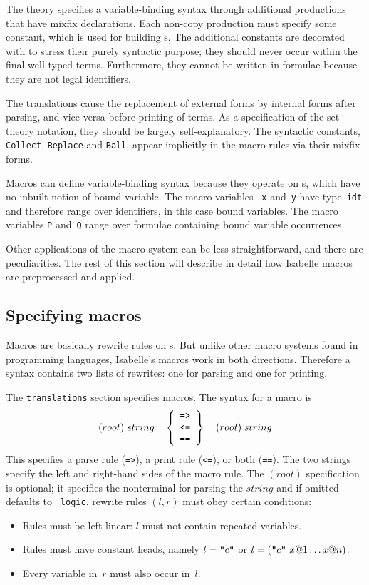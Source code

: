 The theory specifies a variable-binding syntax through additional
productions that have mixfix declarations.  Each non-copy production must
specify some constant, which is used for building \AST{}s.
 The additional constants are decorated with
{\tt\at} to stress their purely syntactic purpose; they should never occur
within the final well-typed terms.  Furthermore, they cannot be written in
formulae because they are not legal identifiers.

The translations cause the replacement of external forms by internal forms
after parsing, and vice versa before printing of terms.  As a specification
of the set theory notation, they should be largely self-explanatory.  The
syntactic constants, {\tt\at Collect}, {\tt\at Replace} and {\tt\at Ball},
appear implicitly in the macro rules via their mixfix forms.

Macros can define variable-binding syntax because they operate on \AST{}s,
which have no inbuilt notion of bound variable.  The macro variables {\tt
  x} and~{\tt y} have type~{\tt idt} and therefore range over identifiers,
in this case bound variables.  The macro variables {\tt P} and~{\tt Q}
range over formulae containing bound variable occurrences.

Other applications of the macro system can be less straightforward, and
there are peculiarities.  The rest of this section will describe in detail
how Isabelle macros are preprocessed and applied.


\subsection{Specifying macros}
Macros are basically rewrite rules on \AST{}s.  But unlike other macro
systems found in programming languages, Isabelle's macros work in both
directions.  Therefore a syntax contains two lists of rewrites: one for
parsing and one for printing.

The {\tt translations} section specifies macros.  The syntax for a macro is
\[ (root)\; string \quad
   \left\{\begin{array}[c]{c} \mbox{\tt =>} \\ \mbox{\tt <=} \\ \mbox{\tt ==} \end{array}
   \right\} \quad
   (root)\; string 
\]
%
This specifies a parse rule ({\tt =>}), a print rule ({\tt <=}), or both
({\tt ==}).  The two strings specify the left and right-hand sides of the
macro rule.  The $(root)$ specification is optional; it specifies the
nonterminal for parsing the $string$ and if omitted defaults to {\tt
  logic}.  \AST{} rewrite rules $(l, r)$ must obey certain conditions:
\begin{itemize}
\item Rules must be left linear: $l$ must not contain repeated variables.

\item Rules must have constant heads, namely $l = \mbox{\tt "}c\mbox{\tt "}$ or $l =
  (\mbox{\tt "}c\mbox{\tt "} ~ x@1 \ldots x@n)$.

\item Every variable in~$r$ must also occur in~$l$.
\end{itemize}

